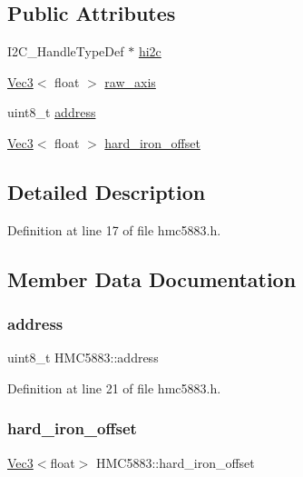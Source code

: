 \subsection*{Public Attributes}
\begin{DoxyCompactItemize}
\item 
I2\+C\+\_\+\+Handle\+Type\+Def $\ast$ \mbox{\hyperlink{struct_h_m_c5883_a71d376bab0252d728f26b8d1be748438}{hi2c}}
\item 
\mbox{\hyperlink{class_vec3}{Vec3}}$<$ float $>$ \mbox{\hyperlink{struct_h_m_c5883_ad1333a78a3f2ef0f1387a8ccc802ba34}{raw\+\_\+axis}}
\item 
uint8\+\_\+t \mbox{\hyperlink{struct_h_m_c5883_a39da59709ba5b1c38d6331ad7997ae18}{address}}
\item 
\mbox{\hyperlink{class_vec3}{Vec3}}$<$ float $>$ \mbox{\hyperlink{struct_h_m_c5883_ae60407010a74561502f2bec3bb986c13}{hard\+\_\+iron\+\_\+offset}}
\end{DoxyCompactItemize}


\subsection{Detailed Description}


Definition at line 17 of file hmc5883.\+h.



\subsection{Member Data Documentation}
\mbox{\label{struct_h_m_c5883_a39da59709ba5b1c38d6331ad7997ae18}} 
\subsubsection{\texorpdfstring{address}{address}}
{\footnotesize\ttfamily uint8\+\_\+t H\+M\+C5883\+::address}



Definition at line 21 of file hmc5883.\+h.

\mbox{\label{struct_h_m_c5883_ae60407010a74561502f2bec3bb986c13}} 
\subsubsection{\texorpdfstring{hard\_iron\_offset}{hard\_iron\_offset}}
{\footnotesize\ttfamily \mbox{\hyperlink{class_vec3}{Vec3}}$<$float$>$ H\+M\+C5883\+::hard\+\_\+iron\+\_\+offset}



